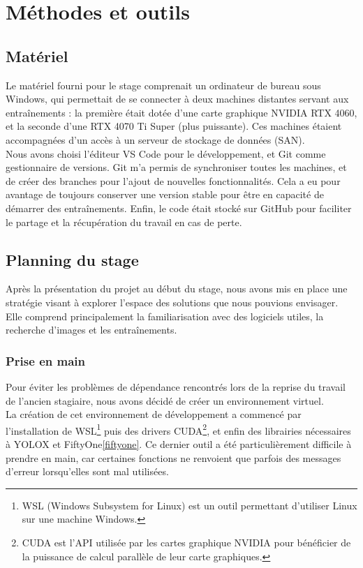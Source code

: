 \chapter{Méthodes et outils}

\section{Matériel}

Le matériel fourni pour le stage comprenait un ordinateur de bureau sous Windows,
qui permettait de se connecter à deux machines distantes servant aux entraînements :
la première était dotée d'une carte graphique NVIDIA RTX 4060, et la seconde d'une
RTX 4070 Ti Super (plus puissante). Ces machines étaient accompagnées d'un accès à un serveur
de stockage de données (SAN). \\

Nous avons choisi l'éditeur VS Code pour le développement, et Git comme gestionnaire de versions.
Git m'a permis de synchroniser toutes les machines, et de créer des branches pour
l'ajout de nouvelles fonctionnalités. Cela a eu pour avantage de toujours
conserver une version stable pour être en capacité de démarrer des entraînements.
Enfin, le code était stocké sur GitHub pour faciliter le partage
et la récupération du travail en cas de perte. \\

\section{Planning du stage}

Après la présentation du projet au début du stage, nous avons mis en place une stratégie
visant à explorer l'espace des solutions que nous pouvions envisager. 
Elle comprend principalement la familiarisation avec des logiciels utiles, 
la recherche d'images et les entraînements. 

\subsection{Prise en main}

Pour éviter les problèmes de dépendance rencontrés lors de la reprise du 
travail de l'ancien stagiaire, nous avons décidé de créer un environnement virtuel. \\

La création de cet environnement de développement a commencé par l'installation
de WSL\footnote{WSL (Windows Subsystem for Linux) est un outil permettant d'utiliser
Linux sur une machine Windows.} puis des drivers CUDA\footnote{CUDA est l'API utilisée par
les cartes graphique NVIDIA pour bénéficier de la puissance de calcul parallèle
de leur carte graphiques.}, et enfin des librairies nécessaires à YOLOX et FiftyOne\ref{fiftyone}.
Ce dernier outil a été particulièrement difficile à prendre en main,
car certaines fonctions ne renvoient que parfois des messages d'erreur
lorsqu'elles sont mal utilisées.\\

